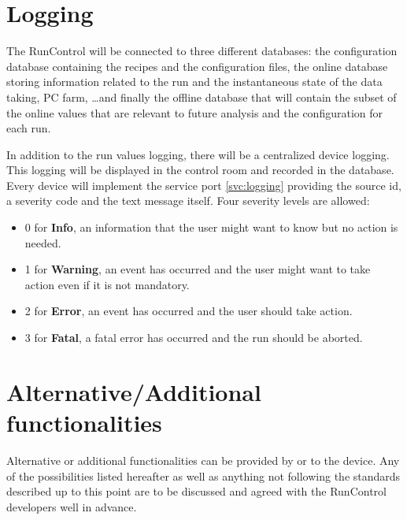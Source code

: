 \documentclass[a4paper]{article}
\begin{document}
\section{Logging}\label{sec:logging}
The RunControl will be connected to three different databases: the configuration database containing
the recipes and the configuration files, the online database storing information related to the
run and the instantaneous state of the data taking, PC farm, \ldots and finally the offline
database that will contain the subset of the online values that are relevant to future analysis and
the configuration for each run.

In addition to the run values logging, there will be a centralized device logging. This logging will
be displayed in the control room and recorded in the database. Every device will implement the
service port \ref{svc:logging} providing the source id, a severity code and the
text message itself. Four severity levels are allowed:
\begin{itemize}
  \item 0 for \textbf{Info}, an information that the user might want to know but
  no action is needed.
  \item 1 for \textbf{Warning}, an event has occurred and the user might want to
  take action even if it is not mandatory.
  \item 2 for \textbf{Error}, an event has occurred and the user should take
  action.
  \item 3 for \textbf{Fatal}, a fatal error has occurred and the run should be
  aborted.
\end{itemize}

\section{Alternative/Additional functionalities}
Alternative or additional functionalities can be provided by or to the device. Any of the
possibilities listed hereafter as well as anything not following the standards described
up to this point are to be discussed and agreed with the RunControl developers well in advance.
\end{document}
